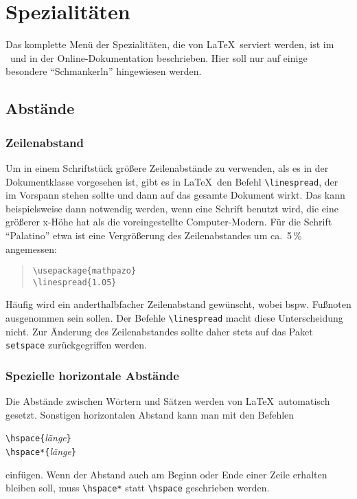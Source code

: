 

\section{Spezialitäten}

Das komplette Menü der Spezialitäten, die von \LaTeX\ serviert
werden, ist im \manual\ und in der Online-Dokumentation beschrieben.
Hier soll nur auf einige besondere "`Schmankerln"' hingewiesen
werden.

\subsection{Abstände}

\subsubsection{Zeilenabstand}

Um in einem Schriftstück größere Zeilenabstände zu verwenden,
als es in der Dokumentklasse vorgesehen ist, gibt es in
\LaTeX\ den Befehl \lstinline:\linespread:, der im Vorspann stehen sollte
und dann auf das gesamte Dokument wirkt.  Das kann beispielsweise
dann notwendig werden, wenn eine Schrift benutzt wird, die eine größerer x-Höhe
hat als die voreingestellte Computer-Modern.  Für die Schrift "`Palatino"' etwa
ist eine Vergrößerung des Zeilenabstandes um ca.\ 5\,\% angemessen:
\begin{quote}
\lstinline|\usepackage{mathpazo}|\\
\lstinline|\linespread{1.05}|
\end{quote}

Häufig wird ein anderthalbfacher Zeilenabstand gewünscht, wobei bspw. Fußnoten ausgenommen
sein sollen. Der Befehle \lstinline:\linespread: macht diese Unterscheidung nicht. Zur
Änderung des Zeilenabstandes sollte daher stets auf das Paket \texttt{setspace} zurückgegriffen werden.



\subsubsection{Spezielle horizontale Abstände}\label{abst:horiz}

Die Abstände zwischen Wörtern und Sätzen werden von \LaTeX\
automatisch gesetzt.
Sonstigen horizontalen Abstand kann man mit den Befehlen
\begin{beispiel}
\lstinline|\hspace{|\textit{länge}\lstinline|}|\\
\lstinline|\hspace*{|\textit{länge}\lstinline|}|
\end{beispiel}
einfügen. Wenn der Abstand auch am Beginn oder Ende einer Zeile
erhalten bleiben soll, muss \lstinline|\hspace*| statt \lstinline|\hspace|
geschrieben werden.

